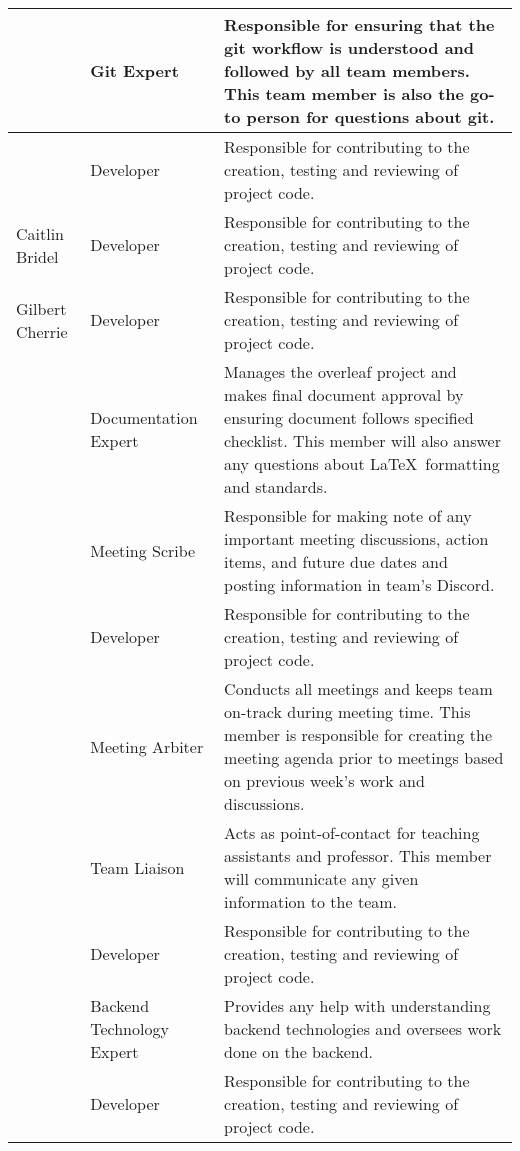 \documentclass{article}
\begin{document}
\begin{longtable}{|>{\centering\arraybackslash}m{.22\linewidth}|>{\centering\arraybackslash}m{.19\linewidth}|m{.59\linewidth}| }
\multirow{2}{*}{\centering Tevis Doe} & Git Expert & Responsible for ensuring that the git workflow is understood and followed by all team members. This team member is also the go-to person for questions about git.  \\
\cline{2-3}
& Developer & Responsible for contributing to the creation, testing and reviewing of project code.\\
\hline
Caitlin Bridel & Developer & Responsible for contributing to the creation, testing and reviewing of project code.\\ 
\hline
Gilbert Cherrie & Developer & Responsible for contributing to the creation, testing and reviewing of project code. \\ 
\hline
\multirow{3}{*}{Rachel Johnson} & Documentation Expert &  Manages the overleaf project and makes final document approval by ensuring document follows specified checklist. This member will also answer any questions about \LaTeX\ formatting and standards. \\ 
\cline{2-3}
& \label{role:meetingscrib} Meeting Scribe & Responsible for making note of any important meeting discussions, action items, and future due dates and posting information in team's Discord. \\ 
\cline{2-3}
& Developer & Responsible for contributing to the creation, testing and reviewing of project code.\\
\hline
\label{role:meetingarb} \multirow{3}{4.5em}{\centering Harkeerat Kanwal} & Meeting Arbiter & Conducts all meetings and keeps team on-track during meeting time. This member is responsible for creating the meeting agenda prior to meetings based on previous week's work and discussions. \\ 
\cline{2-3}
& Team Liaison & Acts as point-of-contact for teaching assistants and professor. This member will communicate any given information to the team. \\ 
\cline{2-3}
& Developer & Responsible for contributing to the creation, testing and reviewing of project code.\\
\hline
\multirow{2}{4em}{\centering Himanshu Aggarwal} & Backend Technology Expert & Provides any help with understanding backend technologies and oversees work done on the backend. \\ 
\cline{2-3}
& Developer & Responsible for contributing to the creation, testing and reviewing of project code.\\
\hline
\end{longtable}
\end{document}
